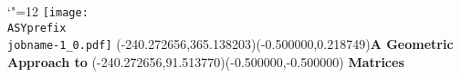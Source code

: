\setlength{\unitlength}{1pt}
\makeatletter%
\let\ASYencoding\f@encoding%
\let\ASYfamily\f@family%
\let\ASYseries\f@series%
\let\ASYshape\f@shape%
\makeatother%
{\catcode`"=12%
\texttt{[image: \\ASYprefix\\jobname-1\_0.pdf]}%
}%
\color{ASYcolor}
\fontsize{12.000000}{14.400000}\selectfont
\usefont{\ASYencoding}{\ASYfamily}{\ASYseries}{\ASYshape}%
\ASYalign(-240.272656,365.138203)(-0.500000,0.218749){{\bfseries \Huge{}A Geometric Approach to}}%
\color{ASYcolor}
\fontsize{12.000000}{14.400000}\selectfont
\ASYalign(-240.272656,91.513770)(-0.500000,-0.500000){{\bfseries \fontsize{60}{80} \selectfont{}Matrices}}%
